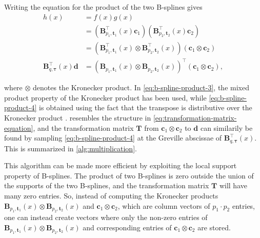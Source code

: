 Writing the equation for the product of the two B-splines gives
\begin{subequations}\label{eq:b-spline-product}
    \begin{align}
        h(x) &= f(x) g(x) \label{eq:b-spline-product-1} \\
        &= \left(\mathbf{B}_{p_1, \mathbf{t}_1}^{\top}(x) \mathbf{c}_1\right) 
        \left(\mathbf{B}_{p_2, \mathbf{t}_2}^{\top}(x) \mathbf{c}_2\right) \label{eq:b-spline-product-2} \\
        &= \left(\mathbf{B}_{p_1, \mathbf{t}_1}^{\top}(x) \otimes \mathbf{B}_{p_2, \mathbf{t}_2}^{\top}(x)\right) 
        \left(\mathbf{c}_1 \otimes \mathbf{c}_2\right) \label{eq:b-spline-product-3} \\
        \mathbf{B}_{q, \boldsymbol{\tau}}^{\top}(x) \mathbf{d} 
        &= \left(\mathbf{B}_{p_1, \mathbf{t}_1}(x) \otimes \mathbf{B}_{p_2, \mathbf{t}_2}(x)\right)^{\top} \left(\mathbf{c}_1 \otimes \mathbf{c}_2\right), \label{eq:b-spline-product-4}
    \end{align}
\end{subequations}

where $\otimes$ denotes the Kronecker product. In \cref{eq:b-spline-product-3}, the mixed product property of the Kronecker product has been used, while \cref{eq:b-spline-product-4} is obtained using the fact that the transpose is distributive over the Kronecker product \citep{LOAN200085}.  resembles the structure in \cref{eq:transformation-matrix-equation}, and the transformation matrix $\mathbf T$ from $\mathbf c_1 \otimes \mathbf c_2$ to $\mathbf d$ can similarily be found by sampling \cref{eq:b-spline-product-4} at the Greville abscissae of $\mathbf B_{q, \boldsymbol{\tau}}^{\top}(x)$. This is summarized in \cref{alg:multiplication}.

This algorithm can be made more efficient by exploiting the local support property of B-splines. The product of two B-splines is zero outside the union of the supports of the two B-splines, and the transformation matrix $\mathbf T$ will have many zero entries. So, instead of computing the Kronecker products $\mathbf B_{p_1, \mathbf{t}_1}(x) \otimes \mathbf B_{p_2, \mathbf{t}_2}(x)$ and $\mathbf c_1 \otimes \mathbf c_2$, which are column vectors of $p_1\cdot p_2$ entries, one can instead create vectors where only the non-zero entries of $\mathbf B_{p_1, \mathbf{t}_1}(x) \otimes \mathbf B_{p_2, \mathbf{t}_2}(x)$ and corresponding entries of $\mathbf c_1 \otimes \mathbf c_2$ are stored. 

